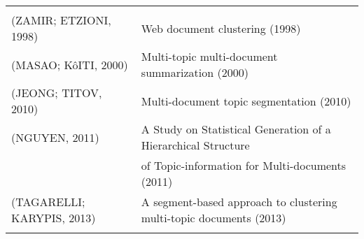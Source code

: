 













\begin{table}[!h]
	\centering

	\begin{tabular}{ll} \hline\\
		(ZAMIR; ETZIONI, 1998) &      Web document clustering (1998)   \\ 
		(MASAO; KôITI, 2000) &        Multi-topic multi-document summarization  (2000)  \\ 
		(JEONG; TITOV, 2010) &        Multi-document topic segmentation (2010)  \\ 
		(NGUYEN, 2011) &              A Study on Statistical Generation of a Hierarchical Structure \\ & of Topic-information for Multi-documents (2011)  \\
		(TAGARELLI; KARYPIS, 2013) &  A segment-based approach to clustering multi-topic documents (2013) \\ \\ \hline
	\end{tabular}
\end{table}




